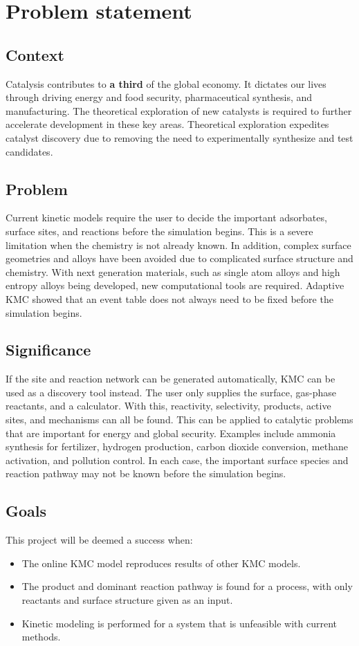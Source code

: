 \section{Problem statement}
\subsection{Context}
\noindent
Catalysis contributes to \textbf{a third} of the global economy.\cite{taseska2023scale}
It dictates our lives through driving energy and food security, pharmaceutical synthesis, and manufacturing.
The theoretical exploration of new catalysts is required to further accelerate development in these key areas.
Theoretical exploration expedites catalyst discovery due to removing the need to experimentally synthesize and test candidates.

\subsection{Problem}
\noindent
Current kinetic models require the user to decide the important adsorbates, surface sites, and reactions before the simulation begins.\cite{andersen2019surfacekmc}
This is a severe limitation when the chemistry is not already known.
In addition, complex surface geometries and alloys have been avoided due to complicated surface structure and chemistry.
With next generation materials, such as single atom alloys and high entropy alloys being developed, new computational tools are required.
Adaptive KMC showed that an event table does not always need to be fixed before the simulation begins.\cite{henkelman2001akmc}


\subsection{Significance}
\noindent
If the site and reaction network can be generated automatically, KMC can be used as a discovery tool instead.
The user only supplies the surface, gas-phase reactants, and a calculator.
With this, reactivity, selectivity, products, active sites, and mechanisms can all be found.
This can be applied to catalytic problems that are important for energy and global security.
Examples include ammonia synthesis for fertilizer, hydrogen production, carbon dioxide conversion, methane activation, and pollution control.
In each case, the important surface species and reaction pathway may not be known before the simulation begins.

\subsection{Goals}
\noindent
This project will be deemed a success when:
\begin{itemize}
    \item The online KMC model reproduces results of other KMC models.
    \item The product and dominant reaction pathway is found for a process, with only reactants and surface structure given as an input.
    \item Kinetic modeling is performed for a system that is unfeasible with current methods.
\end{itemize}

